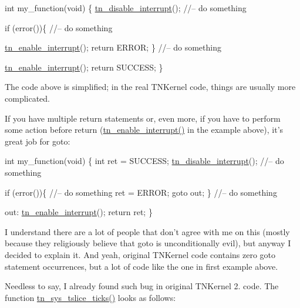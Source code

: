 \begin{DoxyCode}
\textcolor{keywordtype}{int} my\_function(\textcolor{keywordtype}{void})
\{
   \hyperlink{tn__oldsymbols_8h_a27bf94f93625fa36125c3fa3ae6b4041}{tn\_disable\_interrupt}();
   \textcolor{comment}{//-- do something}

   \textcolor{keywordflow}{if} (error())\{
      \textcolor{comment}{//-- do something}

      \hyperlink{tn__oldsymbols_8h_acc85567ca09ede9cf2d58717506def46}{tn\_enable\_interrupt}();
      \textcolor{keywordflow}{return} ERROR;
   \}
   \textcolor{comment}{//-- do something}

   \hyperlink{tn__oldsymbols_8h_acc85567ca09ede9cf2d58717506def46}{tn\_enable\_interrupt}();
   \textcolor{keywordflow}{return} SUCCESS;
\}
\end{DoxyCode}


The code above is simplified; in the real T\+N\+Kernel code, things are usually more complicated.

If you have multiple {\ttfamily return} statements or, even more, if you have to perform some action before return ({\ttfamily \hyperlink{tn__oldsymbols_8h_acc85567ca09ede9cf2d58717506def46}{tn\+\_\+enable\+\_\+interrupt()}} in the example above), it's great job for {\ttfamily goto}\+:


\begin{DoxyCode}
\textcolor{keywordtype}{int} my\_function(\textcolor{keywordtype}{void})
\{
   \textcolor{keywordtype}{int} ret = SUCCESS;
   \hyperlink{tn__oldsymbols_8h_a27bf94f93625fa36125c3fa3ae6b4041}{tn\_disable\_interrupt}();
   \textcolor{comment}{//-- do something}

   \textcolor{keywordflow}{if} (error())\{
      \textcolor{comment}{//-- do something}
      ret = ERROR;
      \textcolor{keywordflow}{goto} out;
   \}
   \textcolor{comment}{//-- do something}

out:
   \hyperlink{tn__oldsymbols_8h_acc85567ca09ede9cf2d58717506def46}{tn\_enable\_interrupt}();
   \textcolor{keywordflow}{return} ret;
\}
\end{DoxyCode}


I understand there are a lot of people that don't agree with me on this (mostly because they religiously believe that {\ttfamily goto} is unconditionally evil), but anyway I decided to explain it. And yeah, original T\+N\+Kernel code contains zero {\ttfamily goto} statement occurrences, but a lot of code like the one in first example above.

Needless to say, I already found such bug in original T\+N\+Kernel 2. code. The function {\ttfamily \hyperlink{tn__oldsymbols_8h_a74b0cfd9bbf5a85f4e0d00a984f60f5e}{tn\+\_\+sys\+\_\+tslice\+\_\+ticks()}} looks as follows\+:


